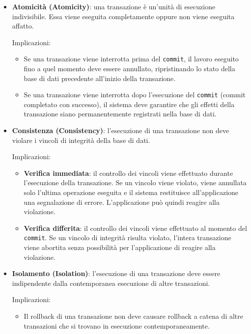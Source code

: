 \begin{itemize}
	
	\item \textbf{Atomicità (Atomicity)}: una transazione è un'unità di esecuzione indivisibile. 
	Essa viene eseguita completamente oppure non viene eseguita affatto.
	
	Implicazioni:
	\begin{itemize}
		\item Se una transazione viene interrotta prima del \texttt{commit}, il lavoro eseguito fino a quel momento deve essere annullato, ripristinando lo stato della base di dati precedente all'inizio della transazione.
		
		\item Se una transazione viene interrotta dopo l'esecuzione del \texttt{commit} (commit completato con successo), il sistema deve garantire che gli effetti della transazione siano permanentemente registrati nella base di dati.
	\end{itemize}
	
	\item \textbf{Consistenza (Consistency)}: l'esecuzione di una transazione non deve violare i vincoli di integrità della base di dati.
	
	Implicazioni:
	\begin{itemize}
		\item \textbf{Verifica immediata}: il controllo dei vincoli viene effettuato durante l'esecuzione della transazione. Se un vincolo viene violato, viene annullata solo l'ultima operazione eseguita e il sistema restituisce all'applicazione una segnalazione di errore. L'applicazione può quindi reagire alla violazione.
		
		\item \textbf{Verifica differita}: il controllo dei vincoli viene effettuato al momento del \texttt{commit}. Se un vincolo di integrità risulta violato, l'intera transazione viene abortita senza possibilità per l'applicazione di reagire alla violazione.
	\end{itemize}
	
	\item \textbf{Isolamento (Isolation)}: l'esecuzione di una transazione deve essere indipendente dalla contemporanea esecuzione di altre transazioni.
	
	Implicazioni:
	\begin{itemize}
		\item Il rollback di una transazione non deve causare rollback a catena di altre transazioni che si trovano in esecuzione contemporaneamente.
		

\end{itemize}
\end{itemize}
